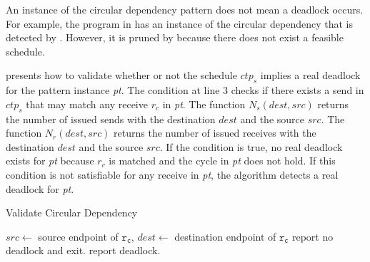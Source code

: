 \examplefigfour

An instance of the circular dependency pattern does not mean a deadlock occurs. For example, the program in  has an instance of the circular dependency that is detected by . However, it is pruned by  because there does not exist a feasible schedule.


 presents how to validate whether or not the schedule $\mathit{ctp_s}$ implies a real deadlock for the pattern instance \textit{pt}. The condition at line 3 checks if there exists a send in $\mathit{ctp_s}$ that may match any receive $\mathit{r_c}$ in \textit{pt}. The function $\mathit{N_s}(\mathit{dest},\mathit{src})$ returns the number of issued sends with the destination $\mathit{dest}$ and the source $\mathit{src}$. The function $\mathit{N_r}(\mathit{dest},\mathit{src})$ returns the number of issued receives with the destination $\mathit{dest}$ and the source $\mathit{src}$.
If the condition is true, no real deadlock exists for \textit{pt} because $\mathit{r_c}$ is matched and the cycle in \textit{pt} does not hold. If this condition is not satisfiable for any receive in \textit{pt}, the algorithm detects a real deadlock for \textit{pt}.

\begin{algorithm}
\caption{Validate Circular Dependency}\label{algo:vcircular}
\begin{algorithmic}[1]
\State $\mathit{src} \gets$ source endpoint of $\mathtt{r_c}$, $\mathit{dest} \gets$ destination endpoint of $\mathtt{r_c}$
\State report no deadlock and exit.
\EndIf
\EndFor
\State report deadlock.
\end{algorithmic}
\end{algorithm}


